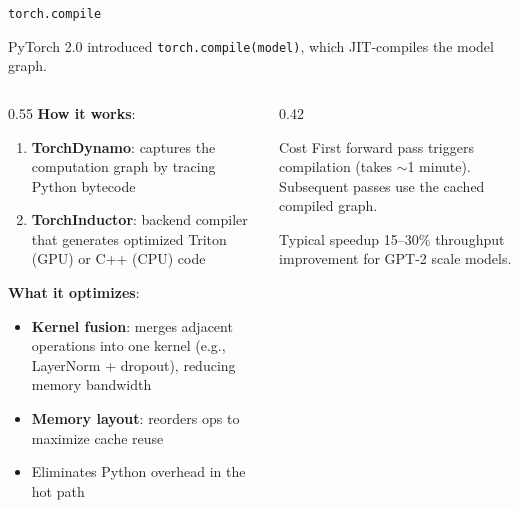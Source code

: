 \begin{frame}{\texttt{torch.compile}}

  PyTorch 2.0 introduced \texttt{torch.compile(model)}, which JIT-compiles the model graph.

  \vspace{0.5em}
  \begin{columns}
    \begin{column}{0.55\textwidth}
      \textbf{How it works}:
      \begin{enumerate}
        \item \textbf{TorchDynamo}: captures the computation graph by tracing Python bytecode
        \item \textbf{TorchInductor}: backend compiler that generates optimized Triton (GPU) or C++ (CPU) code
      \end{enumerate}

      \vspace{0.4em}
      \textbf{What it optimizes}:
      \begin{itemize}
        \item \textbf{Kernel fusion}: merges adjacent operations into one kernel (e.g., LayerNorm + dropout), reducing memory bandwidth
        \item \textbf{Memory layout}: reorders ops to maximize cache reuse
        \item Eliminates Python overhead in the hot path
      \end{itemize}
    \end{column}
    \begin{column}{0.42\textwidth}
      \begin{alertblock}{Cost}
        First forward pass triggers compilation (takes $\sim$1 minute). Subsequent passes use the cached compiled graph.
      \end{alertblock}

      \vspace{0.5em}
      \begin{block}{Typical speedup}
        15--30\% throughput improvement for GPT-2 scale models.
      \end{block}
    \end{column}
  \end{columns}
\end{frame}

